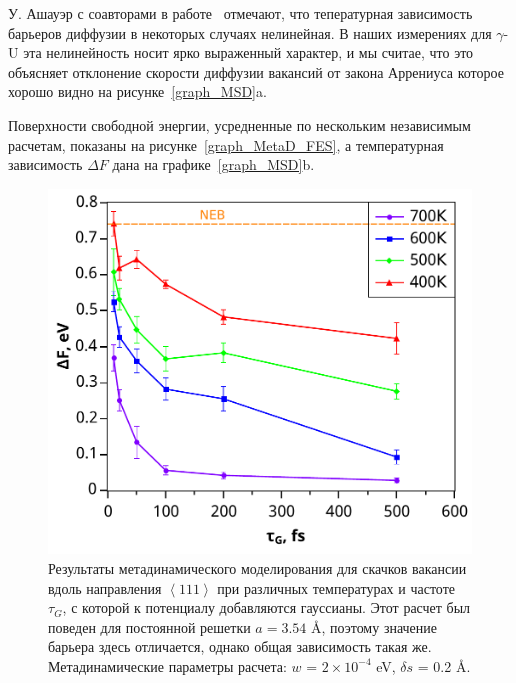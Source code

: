 \documentclass[master,14pt,subf,href,colorlinks=true
]{disser}
\begin{document}
У. Ашауэр с соавторами в работе~\cite{Aschauer_2009} отмечают, что тепературная зависимость барьеров диффузии в некоторых случаях нелинейная. В наших измерениях для $\gamma$-U эта нелинейность носит ярко выраженный характер, и мы считае, что это объясняет отклонение скорости диффузии вакансий от закона Аррениуса которое хорошо видно на рисунке~\ref{graph_MSD}a.

Поверхности свободной энергии, усредненные по нескольким независимым расчетам, показаны на рисунке~\ref{graph_MetaD_FES}, а температурная зависимость $\Delta F$ дана на графике~\ref{graph_MSD}b.

\begin{figure}[h]	%
\begin{center}
\includegraphics[width=.7\linewidth]{W_T_freq.pdf}
\end{center}
\caption{\label{graph_MetaD_freq} Результаты метадинамического моделирования для скачков вакансии вдоль направления $\left\langle 111\right\rangle$ при различных температурах и частоте $\tau_G$, с которой к потенциалу добавляются гауссианы. Этот расчет был поведен для постоянной решетки $a = 3.54$ \r{A}, поэтому значение барьера здесь отличается, однако общая зависимость такая же. Метадинамические параметры расчета: $w$ = $2\times10^{-4}$ eV, $\delta s$ = 0.2 \r{A}.}
\end{figure}
\end{document}

